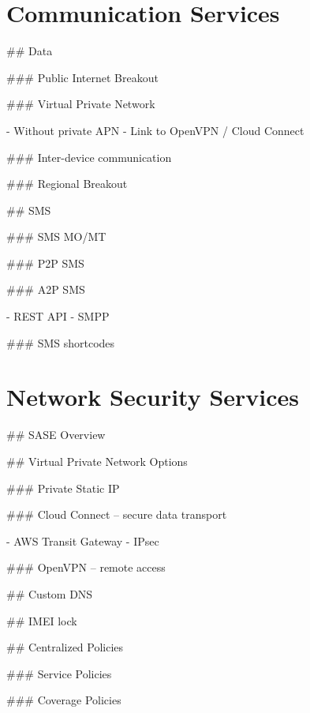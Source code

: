 \documentclass[11pt, oneside]{article}   	%
\newcommand{\addspace}{\vspace{2mm}}
\begin{document}
\section{Communication Services}

\begin{markdown}

## Data

### Public Internet Breakout

### Virtual Private Network
\end{markdown}
\addspace
\begin{markdown}
- Without private APN
- Link to OpenVPN / Cloud Connect
\end{markdown}
\addspace
\begin{markdown}
### Inter-device communication

### Regional Breakout

## SMS

### SMS MO/MT

### P2P SMS

### A2P SMS
\end{markdown}
\addspace
\begin{markdown}
- REST API
- SMPP
\end{markdown}
\addspace
\begin{markdown}
### SMS shortcodes

\end{markdown}

\section{Network Security Services}

\begin{markdown}

## SASE Overview

## Virtual Private Network Options

### Private Static IP

### Cloud Connect – secure data transport
\end{markdown}
\addspace
\begin{markdown}
- AWS Transit Gateway
- IPsec
\end{markdown}
\addspace
\begin{markdown}
### OpenVPN – remote access

## Custom DNS

## IMEI lock

## Centralized Policies

### Service Policies

### Coverage Policies

\end{markdown}
\end{document}
